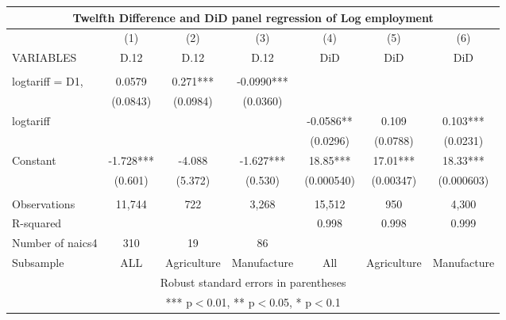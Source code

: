 \begin{tabular}{lcccccc}
\multicolumn{7}{c}{Twelfth Difference and DiD panel regression of Log employment} \\ \hline
 & (1) & (2) & (3) & (4) & (5) & (6) \\
VARIABLES & D.12 & D.12 & D.12 & DiD & DiD & DiD \\ \hline
 &  &  &  &  &  &  \\
logtariff = D1, & 0.0579 & 0.271*** & -0.0990*** &  &  &  \\
 & (0.0843) & (0.0984) & (0.0360) &  &  &  \\
logtariff &  &  &  & -0.0586** & 0.109 & 0.103*** \\
 &  &  &  & (0.0296) & (0.0788) & (0.0231) \\
Constant & -1.728*** & -4.088 & -1.627*** & 18.85*** & 17.01*** & 18.33*** \\
 & (0.601) & (5.372) & (0.530) & (0.000540) & (0.00347) & (0.000603) \\
 &  &  &  &  &  &  \\
Observations & 11,744 & 722 & 3,268 & 15,512 & 950 & 4,300 \\
R-squared &  &  &  & 0.998 & 0.998 & 0.999 \\
Number of naics4 & 310 & 19 & 86 &  &  &  \\
 Subsample & ALL & Agriculture & Manufacture & All & Agriculture & Manufacture \\ \hline
\multicolumn{7}{c}{ Robust standard errors in parentheses} \\
\multicolumn{7}{c}{ *** p$<$0.01, ** p$<$0.05, * p$<$0.1} \\
\end{tabular}
